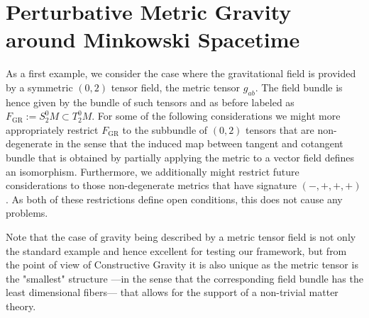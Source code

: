 \section{Perturbative Metric Gravity around Minkowski Spacetime}
As a first example, we consider the case where the gravitational field is provided by a symmetric $(0,2)$ tensor field, the metric tensor $g_{ab}$. The field bundle is hence given by the bundle of such tensors and as before labeled as $F_{\text{GR}} := S^0_2M \subset T^0_2M$. For some of the following considerations we might more appropriately restrict $F_{\text{GR}}$ to the subbundle of $(0,2)$ tensors that are non-degenerate in the sense that the induced map between tangent and cotangent bundle that is obtained by partially applying the metric to a vector field defines an isomorphism. Furthermore, we additionally might restrict future considerations to those non-degenerate metrics that have signature $(-,+,+,+)$. As both of these restrictions define open conditions, this does not cause any problems.

Note that the case of gravity being described by a metric tensor field is not only the standard example and hence excellent for testing our framework, but from the point of view of Constructive Gravity it is also unique as the metric tensor is the "smallest" structure ---in the sense that the corresponding field bundle has the least dimensional fibers--- that allows for the support of a non-trivial matter theory.

